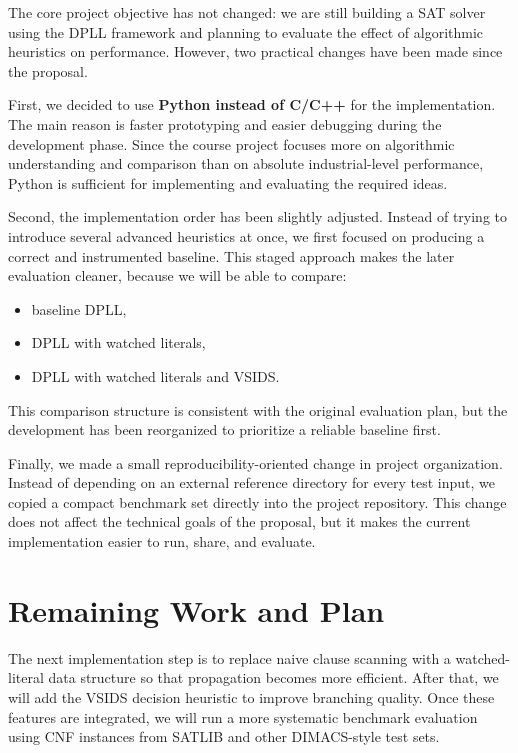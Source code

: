 \documentclass[11pt]{article}
\begin{document}
The core project objective has not changed: we are still building a SAT solver using the DPLL
framework and planning to evaluate the effect of algorithmic heuristics on performance. However,
two practical changes have been made since the proposal.

First, we decided to use \textbf{Python instead of C/C++} for the implementation. The main reason
is faster prototyping and easier debugging during the development phase. Since the course project
focuses more on algorithmic understanding and comparison than on absolute industrial-level
performance, Python is sufficient for implementing and evaluating the required ideas.

Second, the implementation order has been slightly adjusted. Instead of trying to introduce several
advanced heuristics at once, we first focused on producing a correct and instrumented baseline.
This staged approach makes the later evaluation cleaner, because we will be able to compare:

\begin{itemize}
    \item baseline DPLL,
    \item DPLL with watched literals,
    \item DPLL with watched literals and VSIDS.
\end{itemize}

This comparison structure is consistent with the original evaluation plan, but the development has
been reorganized to prioritize a reliable baseline first.

Finally, we made a small reproducibility-oriented change in project organization. Instead of
depending on an external reference directory for every test input, we copied a compact benchmark
set directly into the project repository. This change does not affect the technical goals of the
proposal, but it makes the current implementation easier to run, share, and evaluate.

\section{Remaining Work and Plan}

The next implementation step is to replace naive clause scanning with a watched-literal data
structure so that propagation becomes more efficient. After that, we will add the VSIDS decision
heuristic to improve branching quality. Once these features are integrated, we will run a more
systematic benchmark evaluation using CNF instances from SATLIB and other DIMACS-style test
sets.
\end{document}
